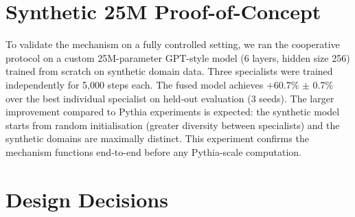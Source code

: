 \documentclass{article}
\begin{document}
\section{Synthetic 25M Proof-of-Concept}
\label{app:synthetic}

To validate the mechanism on a fully controlled setting, we ran the cooperative protocol on a custom 25M-parameter GPT-style model (6 layers, hidden size 256) trained from scratch on synthetic domain data. Three specialists were trained independently for 5,000 steps each. The fused model achieves $+$60.7\% $\pm$ 0.7\% over the best individual specialist on held-out evaluation (3 seeds). The larger improvement compared to Pythia experiments is expected: the synthetic model starts from random initialisation (greater diversity between specialists) and the synthetic domains are maximally distinct. This experiment confirms the mechanism functions end-to-end before any Pythia-scale computation.

\section{Design Decisions}
\label{app:design}
\end{document}
